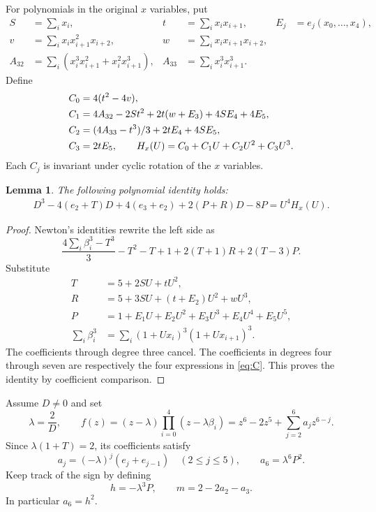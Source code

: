 \documentclass[noproofs]{rmj-public}
\newtheorem{lemma}[thm]{Lemma}
\theoremstyle{definition}
\numberwithin{equation}{section}
\begin{document}
For polynomials in the original $x$ variables, put
\begin{align*}
S&=\sum_i x_i,& t&=\sum_i x_ix_{i+1},& E_j&=e_j(x_0,\ldots,x_4),\\
v&=\sum_i x_ix_{i+1}^2x_{i+2},& w&=\sum_i x_ix_{i+1}x_{i+2},\\
A_{32}&=\sum_i(x_i^3x_{i+1}^2+x_i^2x_{i+1}^3),&
A_{33}&=\sum_i x_i^3x_{i+1}^3.
\end{align*}
Define
\begin{align}\label{eq:C}
C_0&=4(t^2-4v),\notag\\
C_1&=4A_{32}-2St^2+2t(w+E_3)+4SE_4+4E_5,\notag\\
C_2&=(4A_{33}-t^3)/3+2tE_4+4SE_5,\notag\\
C_3&=2tE_5,\qquad H_x(U)=C_0+C_1U+C_2U^2+C_3U^3.
\end{align}
Each $C_j$ is invariant under cyclic rotation of the $x$ variables.

\begin{lemma}\label{lem:universal}
The following polynomial identity holds:
\begin{equation}\label{eq:universal}
\begin{split}
D^3-4(e_2+T)D+4(e_3+e_2)
+2(P+R)D-8P=U^4H_x(U).
\end{split}
\end{equation}
\end{lemma}
\begin{proof}
Newton's identities rewrite the left side as
\[
\frac{4\sum_i\beta_i^3-T^3}{3}-T^2-T+1
+2(T+1)R+2(T-3)P.
\]
Substitute
\begin{align*}
T&=5+2SU+tU^2,\\
R&=5+3SU+(t+E_2)U^2+wU^3,\\
P&=1+E_1U+E_2U^2+E_3U^3+E_4U^4+E_5U^5,\\
\sum_i\beta_i^3&=\sum_i(1+Ux_i)^3(1+Ux_{i+1})^3.
\end{align*}
The coefficients through degree three cancel. The coefficients in degrees
four through seven are respectively the four expressions in
\eqref{eq:C}. This proves the identity by coefficient comparison.
\end{proof}

Assume $D\ne0$ and set
\begin{equation}\label{eq:sextic}
\lambda=\frac2D,\qquad
f(z)=(z-\lambda)\prod_{i=0}^4(z-\lambda\beta_i)
=z^6-2z^5+\sum_{j=2}^6a_jz^{6-j}.
\end{equation}
Since $\lambda(1+T)=2$, its coefficients satisfy
\begin{equation}\label{eq:aj}
a_j=(-\lambda)^j(e_j+e_{j-1})\quad(2\le j\le5),
\qquad a_6=\lambda^6P^2.
\end{equation}
Keep track of the sign by defining
\begin{equation}\label{eq:h}
h=-\lambda^3P,\qquad m=2-2a_2-a_3.
\end{equation}
In particular $a_6=h^2$.
\end{document}
